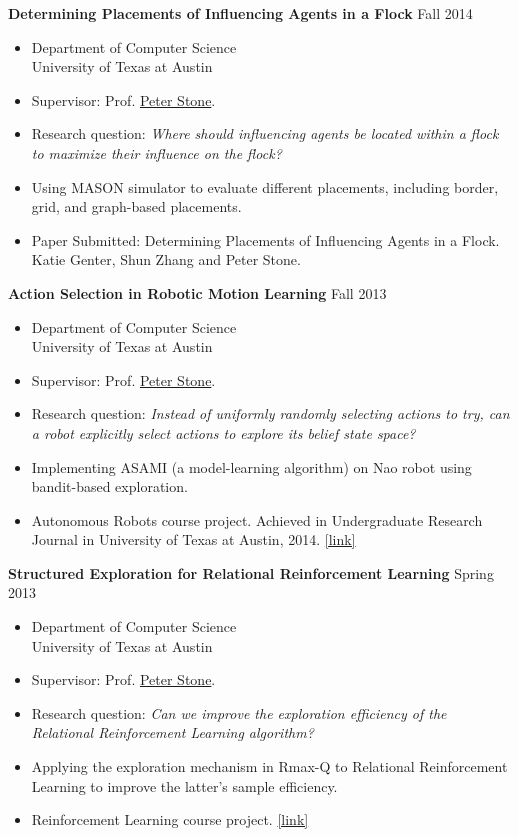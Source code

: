 \documentclass[10pt]{article}
\newenvironment{innerlist}[1][\enskip\textbullet]%
        {\begin{itemize}[#1,leftmargin=*,parsep=0pt,itemsep=0pt,topsep=0pt,partopsep=0pt]}
        {\end{itemize}}
\newcommand\webpage[1]{\href{http://cs.utexas.edu/~menie482/#1}{[link]}}
\begin{document}
\textbf{Determining Placements of Influencing Agents in a Flock} \hfill {Fall 2014}
\begin{innerlist}
\item[] Department of Computer Science\\
        University of Texas at Austin
\vspace{.05in}
\item Supervisor: Prof. \href{http://www.cs.utexas.edu/~pstone/}{Peter Stone}.
\item Research question: {\em Where should influencing agents be located within
a flock to maximize their influence on the flock?}
\item Using MASON simulator to evaluate different placements, including border,
grid, and graph-based placements.
\item Paper Submitted: Determining Placements of Influencing Agents in a Flock.
Katie Genter, Shun Zhang and Peter Stone.
\end{innerlist}
\vspace{.1in}

\textbf{Action Selection in Robotic Motion Learning} \hfill {Fall 2013}
\begin{innerlist}
\item[] Department of Computer Science\\
        University of Texas at Austin
\vspace{.05in}
\item Supervisor: Prof. \href{http://www.cs.utexas.edu/~pstone/}{Peter Stone}.
\item Research question: {\em Instead of uniformly randomly selecting actions to
try, can a robot explicitly select actions to explore its belief state space?}
\item Implementing ASAMI (a model-learning algorithm) on Nao robot using
bandit-based exploration.
\item Autonomous Robots course project. Achieved in Undergraduate Research
Journal in University of Texas at Austin, 2014. \webpage{papers/asami.pdf}
\end{innerlist}
\vspace{.1in}

\textbf{Structured Exploration for Relational Reinforcement Learning} \hfill
{Spring 2013}
\begin{innerlist}
\item[] Department of Computer Science\\
        University of Texas at Austin
\vspace{.05in}
\item Supervisor: Prof. \href{http://www.cs.utexas.edu/~pstone/}{Peter Stone}.
\item Research question: {\em Can we improve the exploration efficiency of the
Relational Reinforcement Learning algorithm?}
\item Applying the exploration mechanism in Rmax-Q to Relational Reinforcement
Learning to improve the latter's sample efficiency.
\item Reinforcement Learning course project.
\webpage{papers/structuredExploration.pdf}
\end{innerlist}
\vspace{.1in}
\end{document}
